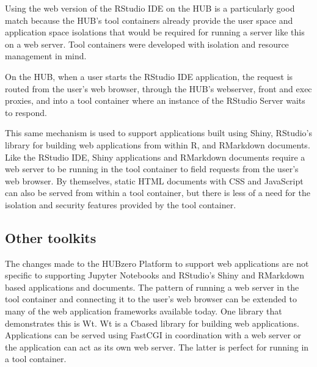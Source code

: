 \documentclass[conference]{../sty/IEEEtran}
\newcommand\CC{C\nolinebreak[4]\hspace{-.05em}\raisebox{.4ex}{\relsize{-3}{\textbf{++}}}\hspace{.25em}}
\begin{document}
Using the web version of the RStudio IDE on the HUB is a particularly good
match because the HUB's tool containers already provide the user space and
application space isolations that would be required for running a server like
this on a web server. Tool containers were developed with isolation and
resource management in mind.

On the HUB, when a user starts the RStudio IDE application, the request is
routed from the user's web browser, through the HUB's webserver, front and exec
proxies, and into a tool container where an instance of the RStudio Server
waits to respond.

This same mechanism is used to support applications built using Shiny,
RStudio's library for building web applications from within R, and RMarkdown
documents. Like the RStudio IDE, Shiny applications and RMarkdown documents
require a web server to be running in the tool container to field requests from
the user's web browser. By themselves, static HTML documents with CSS and JavaScript
can also be served from within a tool container, but there is less of a need
for the isolation and security features provided by the tool container.



\subsection {Other toolkits}

The changes made to the HUBzero Platform to support web applications are not
specific to supporting Jupyter Notebooks and RStudio's Shiny and RMarkdown
based applications and documents. The pattern of running a web server in the
tool container and connecting it to the user's web browser can be extended to
many of the web application frameworks available today. One library that
demonstrates this is Wt\cite{wt}. Wt is a \CC based library for building web
applications. Applications can be served using FastCGI in coordination with a
web server or the application can act as its own web server. The latter is
perfect for running in a tool container.

\end{document}
